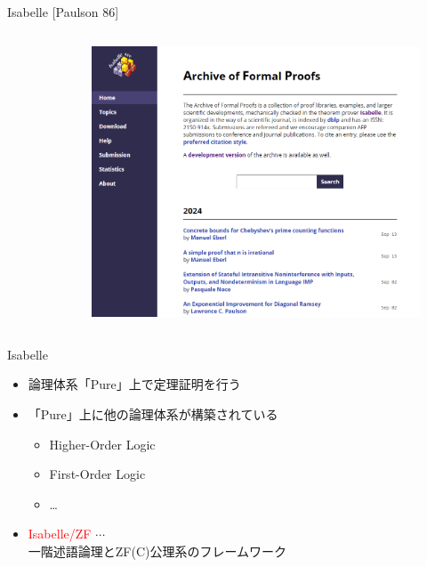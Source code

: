 \documentclass[17pt,aspectratio=169]{beamer}
\begin{document}
\begin{frame}{Isabelle {\small [Paulson 86]}}
\begin{columns}
\begin{column}{0.33\textwidth}
\begin{figure}
            \end{figure}
        \end{column}
        \begin{column}{0.35\textwidth}
            \vspace{-20pt} 
            \begin{figure}
                \includegraphics[width=0.8\linewidth]{./images/isabelle_archive.png}
            \end{figure}
        \end{column}
    \end{columns}
\end{frame}

\begin{frame}{Isabelle}
    \begin{itemize}
        \item 論理体系「Pure」上で定理証明を行う
        \item 「Pure」上に他の論理体系が構築されている
              {\small \begin{itemize}
                  \item Higher-Order Logic
                  \item First-Order Logic \\
                  \item \dots
              \end{itemize} }
              \vspace{-10pt}
        \item \textcolor{red}{Isabelle/ZF} $\cdots$ \\ 
        一階述語論理とZF(C)公理系のフレームワーク
    \end{itemize}
\end{frame}
\end{document}
